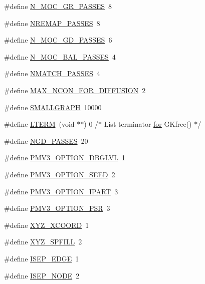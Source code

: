 \begin{DoxyCompactItemize}
\#define \hyperlink{a00894_a6ce6bf3dba85aba79df728a1c82765bb}{N\+\_\+\+M\+O\+C\+\_\+\+G\+R\+\_\+\+P\+A\+S\+S\+ES}~8
\item 
\#define \hyperlink{a00894_a6d8d984a781eb0ce1282973e9fc717a2}{N\+R\+E\+M\+A\+P\+\_\+\+P\+A\+S\+S\+ES}~8
\item 
\#define \hyperlink{a00894_ae83921e4fad34af1caec26a2900b7347}{N\+\_\+\+M\+O\+C\+\_\+\+G\+D\+\_\+\+P\+A\+S\+S\+ES}~6
\item 
\#define \hyperlink{a00894_a5829d749d8c801b4ee14da09df8149ab}{N\+\_\+\+M\+O\+C\+\_\+\+B\+A\+L\+\_\+\+P\+A\+S\+S\+ES}~4
\item 
\#define \hyperlink{a00894_ae9c752a71a5458b9f79fb345a9857c96}{N\+M\+A\+T\+C\+H\+\_\+\+P\+A\+S\+S\+ES}~4
\item 
\#define \hyperlink{a00894_acff8a69ac65c02ad25e4b6b3372d29d8}{M\+A\+X\+\_\+\+N\+C\+O\+N\+\_\+\+F\+O\+R\+\_\+\+D\+I\+F\+F\+U\+S\+I\+ON}~2
\item 
\#define \hyperlink{a00894_adc1e44995bb263760fd75e571f4e5e45}{S\+M\+A\+L\+L\+G\+R\+A\+PH}~10000
\item 
\#define \hyperlink{a00894_ad187417622643f86341db4a2e1cf6a37}{L\+T\+E\+RM}~(void $\ast$$\ast$) 0     /$\ast$ List terminator \hyperlink{a00623_ad1e7380d51df1e0043d24d3c8a860e0a}{for} G\+Kfree() $\ast$/
\item 
\#define \hyperlink{a00894_aee2b1f3b30e5bab6765fe0692a3f92e0}{N\+G\+D\+\_\+\+P\+A\+S\+S\+ES}~20
\item 
\#define \hyperlink{a00894_a5b63a1162aa64d1facdea7fad2012c00}{P\+M\+V3\+\_\+\+O\+P\+T\+I\+O\+N\+\_\+\+D\+B\+G\+L\+VL}~1
\item 
\#define \hyperlink{a00894_a72a742b3752b9c53aeffe33ea8ccc0c0}{P\+M\+V3\+\_\+\+O\+P\+T\+I\+O\+N\+\_\+\+S\+E\+ED}~2
\item 
\#define \hyperlink{a00894_aca32a5fa8c9bde5a54df2577a65be9b7}{P\+M\+V3\+\_\+\+O\+P\+T\+I\+O\+N\+\_\+\+I\+P\+A\+RT}~3
\item 
\#define \hyperlink{a00894_a2c6b97ad03a4da719e1da5e268aea775}{P\+M\+V3\+\_\+\+O\+P\+T\+I\+O\+N\+\_\+\+P\+SR}~3
\item 
\#define \hyperlink{a00894_a84a215e5a2a9ca95da872bb3367bf0ba}{X\+Y\+Z\+\_\+\+X\+C\+O\+O\+RD}~1
\item 
\#define \hyperlink{a00894_abd9c74cd4b43930e841def2e74209ea2}{X\+Y\+Z\+\_\+\+S\+P\+F\+I\+LL}~2
\item 
\#define \hyperlink{a00894_a4f1d3a8dc835e0d2aa628d74328bbe20}{I\+S\+E\+P\+\_\+\+E\+D\+GE}~1
\item 
\#define \hyperlink{a00894_a00a4d8b55b6c0ed64ae56807a70f0d55}{I\+S\+E\+P\+\_\+\+N\+O\+DE}~2
$$
\end{DoxyCompactItemize}
